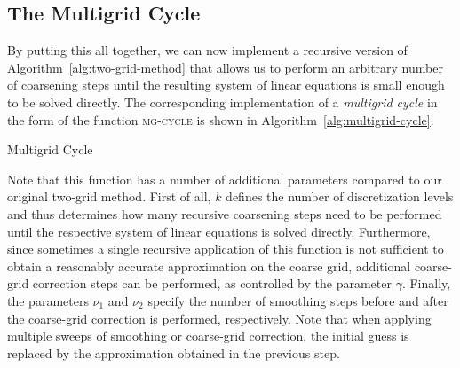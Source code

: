 \subsection{The Multigrid Cycle}\label{sec:multigrid-cycles}
By putting this all together, we can now implement a recursive version of Algorithm~\ref{alg:two-grid-method} that allows us to perform an arbitrary number of coarsening steps until the resulting system of linear equations is small enough to be solved directly.
The corresponding implementation of a \emph{multigrid cycle} in the form of the function \textsc{mg-cycle} is shown in Algorithm~\ref{alg:multigrid-cycle}.
\begin{algorithm}[ht]
	\caption{Multigrid Cycle}
	\label{alg:multigrid-cycle}
	\begin{algorithmic}
		\EndFor
		\Else
		\EndFor
		\EndIf
		\EndFor
		\State {}
		\EndFunction
	\end{algorithmic}
\end{algorithm}
Note that this function has a number of additional parameters compared to our original two-grid method.
First of all, $k$ defines the number of discretization levels and thus determines how many recursive coarsening steps need to be performed until the respective system of linear equations is solved directly.
Furthermore, since sometimes a single recursive application of this function is not sufficient to obtain a reasonably accurate approximation on the coarse grid, additional coarse-grid correction steps can be performed, as controlled by the parameter $\gamma$.
Finally, the parameters $\nu_1$ and $\nu_2$ specify the number of smoothing steps before and after the coarse-grid correction is performed, respectively.
Note that when applying multiple sweeps of smoothing or coarse-grid correction, the initial guess is replaced by the approximation obtained in the previous step.
